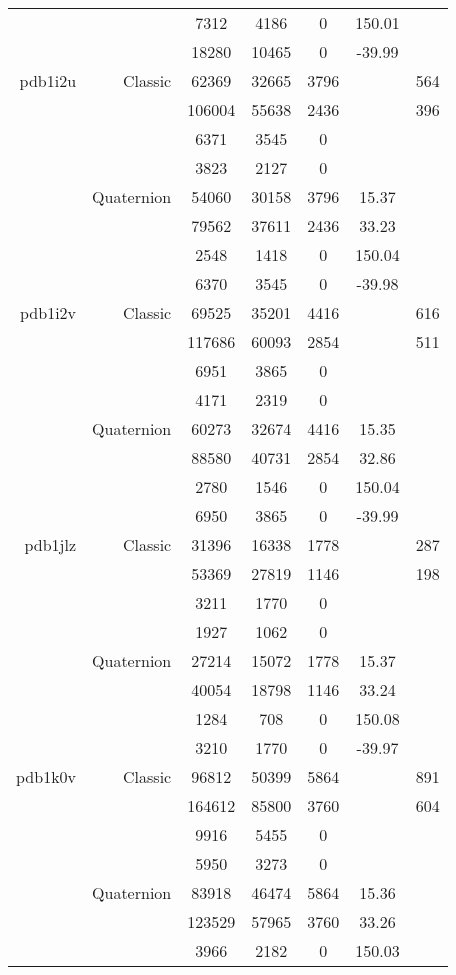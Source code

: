 \begin{xltabular}{\textwidth}{r|rcccSc}
& & 7312 & 4186 & 0 & 150.01 & \\
& & 18280 & 10465 & 0 & -39.99 & \\ \addlinespace
pdb1i2u & Classic & 62369 & 32665 & 3796 & & 564 \\
& & 106004 & 55638 & 2436 & & 396 \\
& & 6371 & 3545 & 0 & & \\
& & 3823 & 2127 & 0 & & \\
& Quaternion & 54060 & 30158 & 3796 & 15.37 & \\
& & 79562 & 37611 & 2436 & 33.23 & \\
& & 2548 & 1418 & 0 & 150.04 & \\
& & 6370 & 3545 & 0 & -39.98 & \\ \addlinespace
pdb1i2v & Classic & 69525 & 35201 & 4416 & & 616 \\
& & 117686 & 60093 & 2854 & & 511 \\
& & 6951 & 3865 & 0 & & \\
& & 4171 & 2319 & 0 & & \\
& Quaternion & 60273 & 32674 & 4416 & 15.35 & \\
& & 88580 & 40731 & 2854 & 32.86 & \\
& & 2780 & 1546 & 0 & 150.04 & \\
& & 6950 & 3865 & 0 & -39.99 & \\ \addlinespace
pdb1jlz & Classic & 31396 & 16338 & 1778 & & 287 \\
& & 53369 & 27819 & 1146 & & 198 \\
& & 3211 & 1770 & 0 & & \\
& & 1927 & 1062 & 0 & & \\
& Quaternion & 27214 & 15072 & 1778 & 15.37 & \\
& & 40054 & 18798 & 1146 & 33.24 & \\
& & 1284 & 708 & 0 & 150.08 & \\
& & 3210 & 1770 & 0 & -39.97 & \\ \addlinespace
pdb1k0v & Classic & 96812 & 50399 & 5864 & & 891 \\
& & 164612 & 85800 & 3760 & & 604 \\
& & 9916 & 5455 & 0 & & \\
& & 5950 & 3273 & 0 & & \\
& Quaternion & 83918 & 46474 & 5864 & 15.36 & \\
& & 123529 & 57965 & 3760 & 33.26 & \\
& & 3966 & 2182 & 0 & 150.03 & \\

\end{xltabular}

